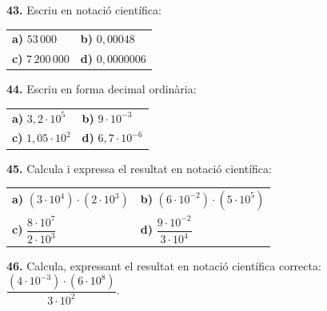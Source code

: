 \documentclass[13pt,a4paper]{extarticle}
\begin{document}
\par\noindent\begin{minipage}{\linewidth}
\textbf{43.} Escriu en notació científica:\par

\begin{tabular}{@{}p{.46\linewidth}p{.46\linewidth}@{}}
\textbf{a)} $53\,000$ & \textbf{b)} $0{,}00048$ \\[2pt]
\textbf{c)} $7\,200\,000$ & \textbf{d)} $0{,}0000006$ \\[2pt]
\end{tabular}\par
\end{minipage}\par\vspace{1.6mm}
\par\noindent\begin{minipage}{\linewidth}
\textbf{44.} Escriu en forma decimal ordinària:\par

\begin{tabular}{@{}p{.46\linewidth}p{.46\linewidth}@{}}
\textbf{a)} $3{,}2\cdot 10^5$ & \textbf{b)} $9\cdot 10^{-3}$ \\[2pt]
\textbf{c)} $1{,}05\cdot 10^{2}$ & \textbf{d)} $6{,}7\cdot 10^{-6}$ \\[2pt]
\end{tabular}\par
\end{minipage}\par\vspace{1.6mm}
\par\noindent\begin{minipage}{\linewidth}
\textbf{45.} Calcula i expressa el resultat en notació científica:\par

\begin{tabular}{@{}p{.46\linewidth}p{.46\linewidth}@{}}
\textbf{a)} $\left(3\cdot10^4\right)\cdot\left(2\cdot10^3\right)$ & \textbf{b)} $\left(6\cdot10^{-2}\right)\cdot\left(5\cdot10^{5}\right)$ \\[2pt]
\textbf{c)} $\dfrac{8\cdot10^7}{2\cdot10^3}$ & \textbf{d)} $\dfrac{9\cdot10^{-2}}{3\cdot10^{4}}$ \\[2pt]
\end{tabular}\par
\end{minipage}\par\vspace{1.6mm}
\par\noindent\begin{minipage}{\linewidth}
\textbf{46.} Calcula, expressant el resultat en notació científica correcta: $\dfrac{\left(4\cdot10^{-3}\right)\cdot\left(6\cdot10^{8}\right)}{3\cdot10^{2}}$.\par
\end{minipage}\par\vspace{1.6mm}
\end{document}
